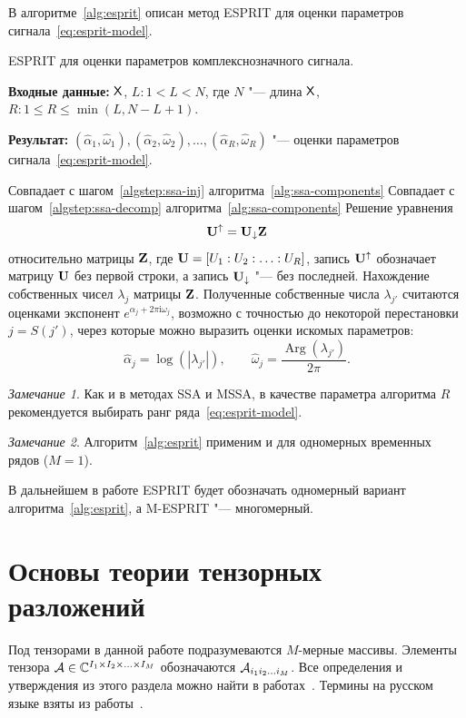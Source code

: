 \documentclass[specialist,
  substylefile=spbu_report.rtx,
subf,href,colorlinks=true, 12pt]{disser}
\theoremstyle{plain}
\theoremstyle{definition}
\theoremstyle{remark}
\newtheorem{remark}{Замечание}[section]
\newcommand{\Input}{\textbf{Входные данные: }}
\newcommand{\Output}{\textbf{Результат: }}
\newcommand{\iu}{\mathrm{i}}
\begin{document}
В алгоритме~\ref{alg:esprit} описан метод ESPRIT для оценки параметров
сигнала~\eqref{eq:esprit-model}.
\begin{algorithm}[!ht]
  \caption{ESPRIT для оценки параметров комплекснозначного сигнала.}
  \label{alg:esprit}
  \Input $\mathsf{X}$, $L: 1 < L < N$, где $N$ "--- длина $\mathsf{X}$, $R: 1
  \leqslant R\leqslant \min(L, N-L+1)$.

  \Output $\left(\widehat{\alpha}_1, \widehat{\omega}_1\right),
  \left(\widehat{\alpha}_2, \widehat{\omega}_2\right), \ldots,
  \left(\widehat{\alpha}_R, \widehat{\omega}_R\right)$ "--- оценки параметров
  сигнала~\eqref{eq:esprit-model}.
  \begin{algorithmic}[1]
    \State Совпадает с шагом~\ref{algstep:ssa-inj}
    алгоритма~\ref{alg:ssa-components}
    \State Совпадает с шагом~\ref{algstep:ssa-decomp}
    алгоритма~\ref{alg:ssa-components}
    \State Решение уравнения
    \[
      \mathbf{U}^{\uparrow}=\mathbf{U}_{\downarrow}\mathbf{Z}
    \]
    относительно матрицы $\mathbf{Z}$, где $\mathbf{U} = [U_1:U_2:\ldots: U_R]$,
    запись $\mathbf{U}^{\uparrow}$ обозначает матрицу $\mathbf{U}$ без первой строки, а
    запись $\mathbf{U}_{\downarrow}$ "--- без последней.
    \State Нахождение собственных
    чисел $\lambda_j$ матрицы $\mathbf{Z}$.
    Полученные собственные числа $\lambda_{j'}$ считаются оценками
    экспонент $e^{\alpha_j + 2\pi\iu \omega_j}$, возможно с точностью
    до некоторой перестановки
    $j = S (j')$, через которые можно выразить
    оценки искомых параметров:
    \[
      \widehat{\alpha}_j = \log\left(\left|\lambda_{j'}\right|\right), \qquad
      \widehat{\omega}_j =
      \frac{\operatorname{Arg}\left(\lambda_{j'}\right)}{2 \pi}.
    \]
  \end{algorithmic}
\end{algorithm}
\begin{remark}
  Как и в методах SSA и MSSA, в качестве параметра алгоритма $R$
  рекомендуется выбирать ранг
  ряда~\eqref{eq:esprit-model}.
\end{remark}
\begin{remark}
  Алгоритм~\ref{alg:esprit} применим и для одномерных временных рядов ($M=1$).
\end{remark}

В дальнейшем в работе ESPRIT будет обозначать одномерный вариант
алгоритма~\ref{alg:esprit}, а M-ESPRIT "--- многомерный.

\section{Основы теории тензорных разложений}\label{sec:tensor-decompositions}
Под тензорами в данной работе подразумеваются $M$-мерные массивы.
Элементы тензора $\mathcal{A} \in \mathbb{C}^{I_1 \times I_2 \times \ldots \times
I_M}$ обозначаются
$\mathcal{A}_{i_1 i_2 \ldots i_M}$.
Все определения и утверждения из этого раздела можно найти в
работах~\cite{Kilmer2011, hosvd, tensor-bg, tensor-bg2, tensor-bg3,Kilmer2013}.
Термины на русском языке взяты из работы~\cite{tensor-rus}.
\end{document}
